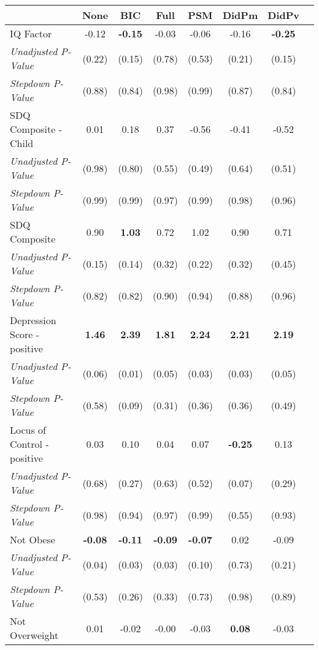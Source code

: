 \begin{tabular}{l c c c c c c c}
\toprule
 & None & BIC & Full & PSM & DidPm & DidPv \\
\midrule
IQ Factor & -0.12 & \textbf{ -0.15 } & -0.03 & -0.06 & -0.16 & \textbf{ -0.25 } \\
\quad \textit{Unadjusted P-Value} & (0.22) & (0.15) & (0.78) & (0.53) & (0.21) & (0.15) \\
\quad \textit{Stepdown P-Value} & (0.88) & (0.84) & (0.98) & (0.99) & (0.87) & (0.84) \\
SDQ Composite - Child & 0.01 & 0.18 & 0.37 & -0.56 & -0.41 & -0.52 \\
\quad \textit{Unadjusted P-Value} & (0.98) & (0.80) & (0.55) & (0.49) & (0.64) & (0.51) \\
\quad \textit{Stepdown P-Value} & (0.99) & (0.99) & (0.97) & (0.99) & (0.98) & (0.96) \\
SDQ Composite & 0.90 & \textbf{ 1.03 } & 0.72 & 1.02 & 0.90 & 0.71 \\
\quad \textit{Unadjusted P-Value} & (0.15) & (0.14) & (0.32) & (0.22) & (0.32) & (0.45) \\
\quad \textit{Stepdown P-Value} & (0.82) & (0.82) & (0.90) & (0.94) & (0.88) & (0.96) \\
Depression Score - positive & \textbf{ 1.46 } & \textbf{ 2.39 } & \textbf{ 1.81 } & \textbf{ 2.24 } & \textbf{ 2.21 } & \textbf{ 2.19 } \\
\quad \textit{Unadjusted P-Value} & (0.06) & (0.01) & (0.05) & (0.03) & (0.03) & (0.05) \\
\quad \textit{Stepdown P-Value} & (0.58) & (0.09) & (0.31) & (0.36) & (0.36) & (0.49) \\
Locus of Control - positive & 0.03 & 0.10 & 0.04 & 0.07 & \textbf{ -0.25 } & 0.13 \\
\quad \textit{Unadjusted P-Value} & (0.68) & (0.27) & (0.63) & (0.52) & (0.07) & (0.29) \\
\quad \textit{Stepdown P-Value} & (0.98) & (0.94) & (0.97) & (0.99) & (0.55) & (0.93) \\
Not Obese & \textbf{ -0.08 } & \textbf{ -0.11 } & \textbf{ -0.09 } & \textbf{ -0.07 } & 0.02 & -0.09 \\
\quad \textit{Unadjusted P-Value} & (0.04) & (0.03) & (0.03) & (0.10) & (0.73) & (0.21) \\
\quad \textit{Stepdown P-Value} & (0.53) & (0.26) & (0.33) & (0.73) & (0.98) & (0.89) \\
Not Overweight & 0.01 & -0.02 & -0.00 & -0.03 & \textbf{ 0.08 } & -0.03 \\

\end{tabular}
